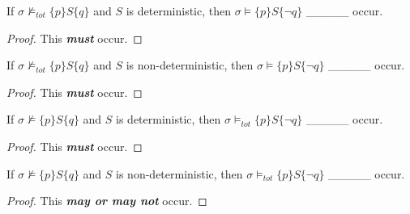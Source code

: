 \documentclass[12pt]{article}
\newenvironment{exercise}[2][Exercise]{\begin{trivlist}
\item[\hskip \labelsep {\bfseries #1}\hskip \labelsep {\bfseries #2.}]}{\end{trivlist}}
\begin{document}
\begin{exercise}{13}
If $\sigma \not\models_{tot} \{p\}S\{q\}$ and $S$ is deterministic, then $\sigma \models \{p\}S\{\neg q\}$ \_\_\_\_\_ occur. 
\end{exercise}

\begin{proof}
This \textit{\textbf{must}} occur.
\end{proof}

\begin{exercise}{14}
If $\sigma \not\models_{tot} \{p\}S\{q\}$ and $S$ is non-deterministic, then $\sigma \models \{p\}S\{\neg q\}$ \_\_\_\_\_ occur. 
\end{exercise}

\begin{proof}
This \textit{\textbf{must}} occur.
\end{proof}

\begin{exercise}{15}
If $\sigma \not\models \{p\}S\{q\}$ and $S$ is deterministic, then $\sigma \models_{tot} \{p\}S\{\neg q\}$ \_\_\_\_\_ occur. 
\end{exercise}

\begin{proof}
This \textit{\textbf{must}} occur.
\end{proof}

\begin{exercise}{16}
If $\sigma \not\models \{p\}S\{q\}$ and $S$ is non-deterministic, then $\sigma \models_{tot} \{p\}S\{\neg q\}$ \_\_\_\_\_ occur. 
\end{exercise}

\begin{proof}
This \textit{\textbf{may or may not}} occur.
\end{proof}
\end{document}
